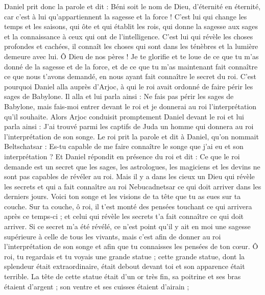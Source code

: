 \begin{multicols}{2}
Daniel prit donc la parole et dit : Béni soit le nom de Dieu, d'éternité en éternité, car c'est à lui qu'appartiennent la sagesse et la force !
C'est lui qui change les temps et les saisons, qui ôte et qui établit les rois, qui donne la sagesse aux sages et la connaissance à ceux qui ont de l'intelligence.
C'est lui qui révèle les choses profondes et cachées, il connaît les choses qui sont dans les ténèbres et la lumière demeure avec lui.
Ô Dieu de nos pères ! Je te glorifie et te loue de ce que tu m'as donné de la sagesse et de la force, et de ce que tu m'as maintenant fait connaître ce que nous t'avons demandé, en nous ayant fait connaître le secret du roi.
C'est pourquoi Daniel alla auprès d'Arjoc, à qui le roi avait ordonné de faire périr les sages de Babylone. Il alla et lui parla ainsi : Ne fais pas périr les sages de Babylone, mais fais-moi entrer devant le roi et je donnerai au roi l'interprétation qu'il souhaite.
Alors Arjoc conduisit promptement Daniel devant le roi et lui parla ainsi : J'ai trouvé parmi les captifs de Juda un homme qui donnera au roi l'interprétation de son songe.
Le roi prit la parole et dit à Daniel, qu'on nommait Beltschatsar : Es-tu capable de me faire connaître le songe que j'ai eu et son interprétation ?
Et Daniel répondit en présence du roi et dit : Ce que le roi demande est un secret que les sages, les astrologues, les magiciens et les devins ne sont pas capables de révéler au roi.
Mais il y a dans les cieux un Dieu qui révèle les secrets et qui a fait connaître au roi Nebucadnetsar ce qui doit arriver dans les derniers jours. Voici ton songe et les visions de ta tête que tu as eues sur ta couche.
Sur ta couche, ô roi, il t'est monté des pensées touchant ce qui arrivera après ce temps-ci ; et celui qui révèle les secrets t'a fait connaître ce qui doit arriver.
Si ce secret m'a été révélé, ce n'est point qu'il y ait en moi une sagesse supérieure à celle de tous les vivants, mais c'est afin de donner au roi l'interprétation de son songe et afin que tu connaisses les pensées de ton cœur.
Ô roi, tu regardais et tu voyais une grande statue ; cette grande statue, dont la splendeur était extraordinaire, était debout devant toi et son apparence était terrible.
La tête de cette statue était d'un or très fin, sa poitrine et ses bras étaient d'argent ; son ventre et ses cuisses étaient d'airain ;

\end{multicols}

